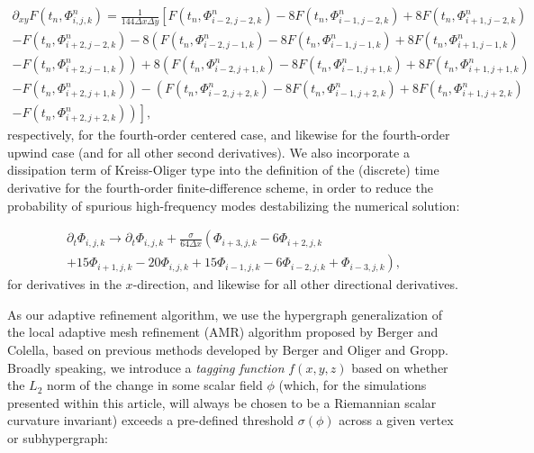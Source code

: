 \documentclass{article}
\begin{document}
\begin{multline}
\partial_{x y} F \left( t_n, \Phi_{i, j, k}^{n} \right) = \frac{1}{144 \Delta x \Delta y} \left[ F \left( t_n, \Phi_{i - 2, j - 2, k}^{n} \right) - 8 F \left( t_n, \Phi_{i - 1, j - 2, k}^{n} \right) + 8 F \left( t_n, \Phi_{i + 1, j - 2, k}^{n} \right) \right. \\
\left. - F \left( t_n, \Phi_{i + 2, j - 2, k}^{n} \right) - 8 \left( F \left( t_n, \Phi_{i - 2, j - 1, k}^{n} \right) - 8 F \left( t_n, \Phi_{i - 1, j - 1, k}^{n} \right) + 8 F \left( t_n, \Phi_{i + 1, j - 1, k}^{n} \right) \right. \right.\\
\left. \left. - F \left( t_n, \Phi_{i + 2, j - 1, k}^{n} \right) \right) + 8 \left( F \left( t_n, \Phi_{i - 2, j + 1, k}^{n} \right) - 8 F \left( t_n, \Phi_{i - 1, j + 1, k}^{n} \right) + 8 F \left( t_n, \Phi_{i + 1, j + 1, k}^{n} \right) \right. \right.\\
\left. \left. - F \left( t_n, \Phi_{i + 2, j + 1, k}^{n} \right) \right) - \left( F \left( t_n, \Phi_{i - 2, j + 2, k}^{n} \right) - 8 F \left( t_n, \Phi_{i - 1, j + 2, k}^{n} \right) + 8 F \left( t_n, \Phi_{i + 1, j + 2, k}^{n} \right) \right. \right.\\
\left. \left. - F \left( t_n, \Phi_{i + 2, j + 2, k}^{n} \right) \right) \right],
\end{multline}
respectively, for the fourth-order centered case, and likewise for the fourth-order upwind case (and for all other second derivatives). We also incorporate a dissipation term of Kreiss-Oliger type\cite{kreiss2} into the definition of the (discrete) time derivative for the fourth-order finite-difference scheme, in order to reduce the probability of spurious high-frequency modes destabilizing the numerical solution:

\begin{multline}
\partial_t \Phi_{i, j, k} \to \partial_t \Phi_{i, j, k} + \frac{\sigma}{64 \Delta x} \left( \Phi_{i + 3, j, k} - 6 \Phi_{i + 2, j, k} \right.\\
\left. + 15 \Phi_{i + 1, j, k} - 20 \Phi_{i, j, k} + 15 \Phi_{i - 1, j, k} - 6 \Phi_{i - 2, j, k} + \Phi_{i - 3, j, k} \right),
\end{multline}
for derivatives in the $x$-direction, and likewise for all other directional derivatives.

As our adaptive refinement algorithm, we use the hypergraph generalization of the local adaptive mesh refinement (AMR) algorithm proposed by Berger and Colella\cite{berger}, based on previous methods developed by Berger and Oliger\cite{berger2} and Gropp\cite{gropp}. Broadly speaking, we introduce a \textit{tagging function} ${f \left( x, y, z \right)}$ based on whether the ${L_2}$ norm of the change in some scalar field ${\phi}$ (which, for the simulations presented within this article, will always be chosen to be a Riemannian scalar curvature invariant) exceeds a pre-defined threshold ${\sigma \left( \phi \right)}$ across a given vertex or subhypergraph:
\end{document}
